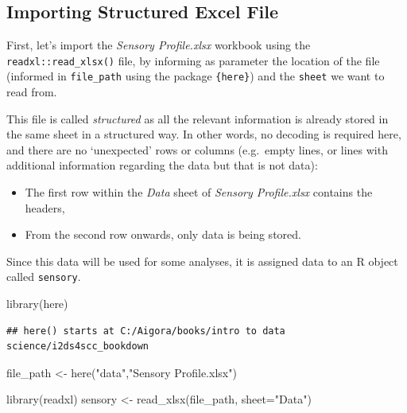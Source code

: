 \documentclass[
]{book}
\newenvironment{Shaded}{\begin{snugshade}}{\end{snugshade}}
\newcommand{\AttributeTok}[1]{\textcolor[rgb]{0.77,0.63,0.00}{#1}}
\newcommand{\FunctionTok}[1]{\textcolor[rgb]{0.00,0.00,0.00}{#1}}
\newcommand{\NormalTok}[1]{#1}
\newcommand{\OtherTok}[1]{\textcolor[rgb]{0.56,0.35,0.01}{#1}}
\newcommand{\StringTok}[1]{\textcolor[rgb]{0.31,0.60,0.02}{#1}}
\providecommand{\tightlist}{%
  \setlength{\itemsep}{0pt}\setlength{\parskip}{0pt}}
\begin{document}
\hypertarget{importing-structured-excel-file}{%
\subsection{Importing Structured Excel File}\label{importing-structured-excel-file}}

First, let's import the \emph{Sensory Profile.xlsx} workbook using the \texttt{readxl::read\_xlsx()} file, by informing as parameter the location of the file (informed in \texttt{file\_path} using the package \texttt{\{here\}}) and the \texttt{sheet} we want to read from.

This file is called \emph{structured} as all the relevant information is already stored in the same sheet in a structured way. In other words, no decoding is required here, and there are no `unexpected' rows or columns (e.g.~empty lines, or lines with additional information regarding the data but that is not data):

\begin{itemize}
\tightlist
\item
  The first row within the \emph{Data} sheet of \emph{Sensory Profile.xlsx} contains the headers,\\
\item
  From the second row onwards, only data is being stored.
\end{itemize}

Since this data will be used for some analyses, it is assigned data to an R object called \texttt{sensory}.

\begin{Shaded}
\begin{Highlighting}[]
\FunctionTok{library}\NormalTok{(here)}
\end{Highlighting}
\end{Shaded}

\begin{verbatim}
## here() starts at C:/Aigora/books/intro to data science/i2ds4scc_bookdown
\end{verbatim}

\begin{Shaded}
\begin{Highlighting}[]
\NormalTok{file\_path }\OtherTok{\textless{}{-}} \FunctionTok{here}\NormalTok{(}\StringTok{"data"}\NormalTok{,}\StringTok{"Sensory Profile.xlsx"}\NormalTok{) }

\FunctionTok{library}\NormalTok{(readxl)}
\NormalTok{sensory }\OtherTok{\textless{}{-}} \FunctionTok{read\_xlsx}\NormalTok{(file\_path, }\AttributeTok{sheet=}\StringTok{"Data"}\NormalTok{)}
\end{Highlighting}
\end{Shaded}
\end{document}
